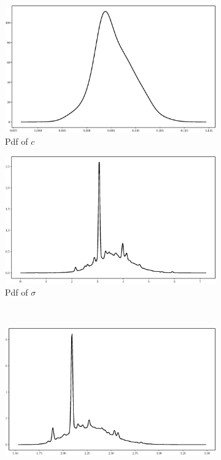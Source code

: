 \documentclass[]{elsarticle}
\begin{document}
\begin{figure}[!htb]
\centering
\begin{subfigure}{.49\textwidth}
\includegraphics[width=\linewidth,keepaspectratio]{./figs/Case00/Model4_c.eps}
\caption{Pdf of $c$}
\end{subfigure}
\begin{subfigure}{.49\textwidth}
\centering
\includegraphics[width=\linewidth,keepaspectratio]{./figs/Case00/Model4_sigma.eps}
\caption{Pdf of $\sigma$}
\label{fig:s1c}
\end{subfigure}\\
\begin{subfigure}{.49\textwidth}
\centering
\includegraphics[width=\linewidth,keepaspectratio]{./figs/Case00/Model4_gamma.eps}

\end{subfigure}
\end{figure}
\end{document}

